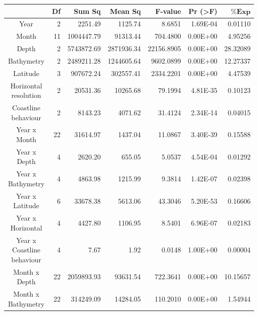 \begin{table}[H]
\centering
\begin{adjustbox}{width=1.2\textwidth}
\small
\begin{tabular}{c|r|r|r|r|r|r}
\hline
 							     &
  \textbf{Df} 				     &
  \textbf{Sum Sq} 			     &
  \textbf{Mean Sq} 			     &
  \textbf{F-value} 			     &
  \textbf{Pr (\textgreater{F})} &
  $\mathbf{\% Exp}$     		 \\
\hline
Year                             & 2     & 2251.49    & 1125.74    & 8.6851     & 1.69E-04  & 0.01110  \\
Month                            & 11    & 1004447.79 & 91313.44   & 704.4800   & 0.00E+00  & 4.95256  \\
Depth                            & 2  & 5743872.69 & 2871936.34 & 22156.8905 & 0.00E+00  & 28.32089 \\
Bathymetry                       & 2  & 2489211.28 & 1244605.64 & 9602.0899  & 0.00E+00  & 12.27337 \\
Latitude                         & 3  & 907672.24  & 302557.41  & 2334.2201  & 0.00E+00  & 4.47539  \\
Horizontal resolution            & 2  & 20531.36   & 10265.68   & 79.1994    & 4.81E-35  & 0.10123  \\
Coastline behaviour              & 2  & 8143.23    & 4071.62    & 31.4124    & 2.34E-14  & 0.04015  \\
Year x Month                     & 22 & 31614.97   & 1437.04    & 11.0867    & 3.40E-39  & 0.15588  \\
Year x Depth                     & 4  & 2620.20    & 655.05     & 5.0537     & 4.54E-04  & 0.01292  \\
Year x Bathymetry                & 4  & 4863.98    & 1215.99    & 9.3814     & 1.42E-07  & 0.02398  \\
Year x Latitude                  & 6  & 33678.38   & 5613.06    & 43.3046    & 5.20E-53  & 0.16606  \\
Year x Horizontal                & 4  & 4427.80    & 1106.95    & 8.5401     & 6.96E-07  & 0.02183  \\
Year x Coastline behaviour       & 4  & 7.67       & 1.92       & 0.0148     & 1.00E+00  & 0.00004  \\
Month x Depth                    & 22 & 2059893.93 & 93631.54   & 722.3641   & 0.00E+00  & 10.15657 \\
Month x Bathymetry               & 22 & 314249.09  & 14284.05   & 110.2010   & 0.00E+00  & 1.54944  \\

\end{tabular}
\end{adjustbox}
\end{table}
